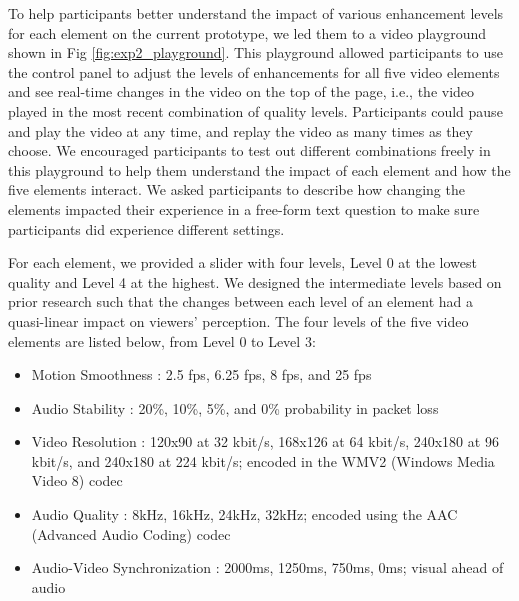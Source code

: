 To help participants better understand the impact of various enhancement levels for each element on the current prototype, we led them to a video playground shown in Fig \ref{fig:exp2_playground}. This playground allowed participants to use the control panel to adjust the levels of enhancements for all five video elements and see real-time changes in the video on the top of the page, i.e., the video played in the most recent combination of quality levels. Participants could pause and play the video at any time, and replay the video as many times as they choose. We encouraged participants to test out different combinations freely in this playground to help them understand the impact of each element and how the five elements interact. We asked participants to describe how changing the elements impacted their experience in a free-form text question to make sure participants did experience different settings.


For each element, we provided a slider with four levels, Level 0 at the lowest quality and Level 4 at the highest. We designed the intermediate levels based on prior research such that the changes between each level of an element had a quasi-linear impact on viewers' perception. The four levels of the five video elements are listed below, from Level 0 to Level 3:
\begin{itemize}
    \item Motion Smoothness \cite{huynh2008temporal}: 2.5 fps, 6.25 fps, 8 fps, and 25 fps
    \item Audio Stability \cite{hardman1998successful}: 20\%, 10\%, 5\%, and 0\% probability in packet loss
    \item Video Resolution \cite{knoche2005can}: 120x90 at 32 kbit/s, 168x126 at 64 kbit/s, 240x180 at 96 kbit/s, and 240x180 at 224 kbit/s; encoded in the WMV2 (Windows Media Video 8) codec 
    \item Audio Quality \cite{knoche2008low, noll1993wideband}: 8kHz, 16kHz, 24kHz, 32kHz; encoded using the AAC (Advanced Audio Coding) codec
    \item Audio-Video Synchronization \cite{steinmetz1996human}: 2000ms, 1250ms, 750ms, 0ms; visual ahead of audio
\end{itemize}


